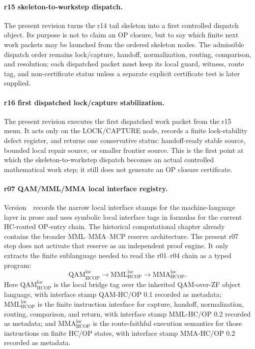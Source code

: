 \paragraph{r15 skeleton-to-workstep dispatch.}
The present revision turns the r14 tail skeleton into a first controlled dispatch object. Its purpose is not to claim an OP closure, but to say which finite next work packets may be launched from the ordered skeleton nodes. The admissible dispatch order remains lock/capture, handoff, normalization, routing, comparison, and resolution; each dispatched packet must keep its local guard, witness, route tag, and non-certificate status unless a separate explicit certificate test is later supplied.

\paragraph{r16 first dispatched lock/capture stabilization.}
The present revision executes the first dispatched work packet from the r15 menu. It acts only on the LOCK/CAPTURE node, records a finite lock-stability defect register, and returns one conservative status: handoff-ready stable source, bounded local repair source, or smaller frontier source. This is the first point at which the skeleton-to-workstep dispatch becomes an actual controlled mathematical work step; it still does not generate an OP closure certificate.


\paragraph{r07 QAM/MML/MMA local interface registry.}
Version~\docversion\ records the narrow local interface stamps for the machine-language layer in prose and uses symbolic local interface tags in formulas for the current HC-routed OP-entry chain. The historical computational chapter already contains the broader MML--MMA--MCP reserve architecture. The present r07 step does not activate that reserve as an independent proof engine. It only extracts the finite sublanguage needed to read the r01--r04 chain as a typed program:
\[
  \mathrm{QAM}_{\mathrm{HCOP}}^{\mathrm{loc}}
  \longrightarrow
  \mathrm{MML}_{\mathrm{HCOP}}^{\mathrm{loc}}
  \longrightarrow
  \mathrm{MMA}_{\mathrm{HCOP}}^{\mathrm{loc}}.
\]
Here \(\mathrm{QAM}_{\mathrm{HCOP}}^{\mathrm{loc}}\) is the local bridge tag over the inherited QAM-over-ZF object language, with interface stamp QAM-HC/OP 0.1 recorded as metadata; \(\mathrm{MML}_{\mathrm{HCOP}}^{\mathrm{loc}}\) is the finite instruction interface for capture, handoff, normalization, routing, comparison, and return, with interface stamp MML-HC/OP 0.2 recorded as metadata; and \(\mathrm{MMA}_{\mathrm{HCOP}}^{\mathrm{loc}}\) is the route-faithful execution semantics for those instructions on finite HC/OP states, with interface stamp MMA-HC/OP 0.2 recorded as metadata.


